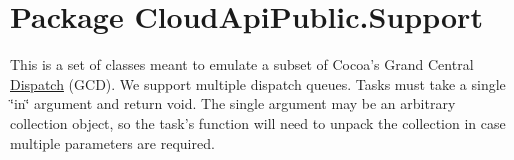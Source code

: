 \hypertarget{namespace_cloud_api_public_1_1_support}{\section{Package Cloud\-Api\-Public.\-Support}
\label{namespace_cloud_api_public_1_1_support}
}


This is a set of classes meant to emulate a subset of Cocoa's Grand Central \hyperlink{class_cloud_api_public_1_1_support_1_1_dispatch}{Dispatch} (G\-C\-D). We support multiple dispatch queues. Tasks must take a single \char`\"{}in\char`\"{} argument and return void. The single argument may be an arbitrary collection object, so the task's function will need to unpack the collection in case multiple parameters are required.  


